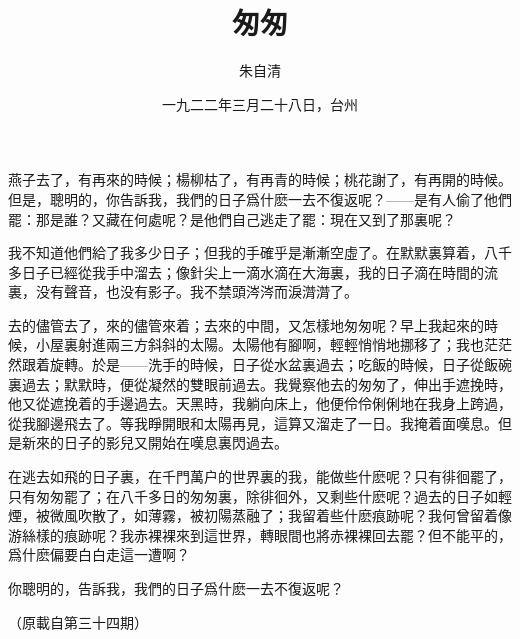 \documentclass[a5j,12pt]{ltjtarticle}
\title{\gtfamily 匆匆}
\author{\small\kai 朱自清}
\date{}
\begin{document}
\maketitle

燕子去了，有再來的時候；楊柳枯了，有再青的時候；桃花謝了，有再開的時候。但是，聰明的，你告訴我，我們的日子爲什麽一去不復返呢？——是有人偷了他們罷：那是誰？又藏在何處呢？是他們自己逃走了罷：現在又到了那裏呢？

我不知道他們給了我多少日子；但我的手確乎是漸漸空虛了。在默默裏算着，八千多日子已經從我手中溜去；像針尖上一滴水滴在大海裏，我的日子滴在時間的流裏，没有聲音，也没有影子。我不禁頭涔涔而淚潸潸了。

去的儘管去了，來的儘管來着；去來的中間，又怎樣地匆匆呢？早上我起來的時候，小屋裏射進兩三方斜斜的太陽。太陽他有腳啊，輕輕悄悄地挪移了；我也茫茫然跟着旋轉。於是——洗手的時候，日子從水盆裏過去；吃飯的時候，日子從飯碗裏過去；默默時，便從凝然的雙眼前過去。我覺察他去的匆匆了，伸出手遮挽時，他又從遮挽着的手邊過去。天黑時，我躺向床上，他便伶伶俐俐地在我身上跨過，從我腳邊飛去了。等我睜開眼和太陽再見，這算又溜走了一日。我掩着面嘆息。但是新來的日子的影兒又開始在嘆息裏閃過去。

在逃去如飛的日子裏，在千門萬户的世界裏的我，能做些什麽呢？只有徘徊罷了，只有匆匆罷了；在八千多日的匆匆裏，除徘徊外，又剩些什麽呢？過去的日子如輕煙，被微風吹散了，如薄霧，被初陽蒸融了；我留着些什麽痕跡呢？我何曾留着像游絲樣的痕跡呢？我赤裸裸來到這世界，轉眼間也將赤裸裸回去罷？但不能平的，爲什麽偏要白白走這一遭啊？

你聰明的，告訴我，我們的日子爲什麽一去不復返呢？

\hfill \date{一九二二年三月二十八日，台州}

\hfill （原載自第三十四期）\hspace{2\zw}
\end{document}
